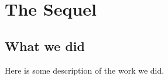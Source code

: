 \chapter{The Sequel}
\label{c.Sequel}
\section{What we did}
\label{s.Work}
Here is some description of the work we did.\\

\citep{Ade2013b}
